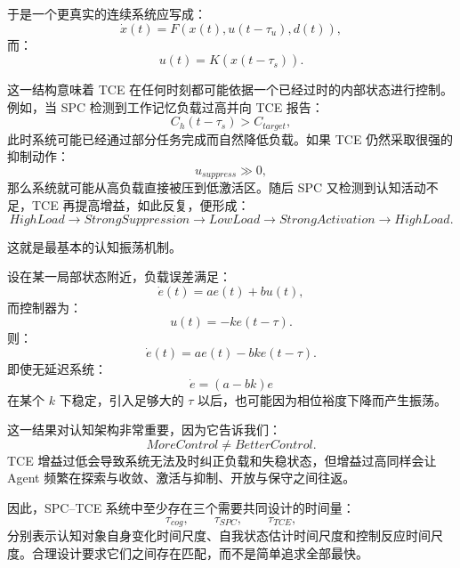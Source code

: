 于是一个更真实的连续系统应写成：
\begin{equation}
\dot{x}(t)
=
F
\left(
x(t),
u(t-\tau_u),
d(t)
\right),
\end{equation}
而：
\begin{equation}
u(t)
=
K
\left(
\hat{x}(t-\tau_s)
\right).
\end{equation}

这一结构意味着 TCE 在任何时刻都可能依据一个已经过时的内部状态进行控制。例如，当 SPC 检测到工作记忆负载过高并向 TCE 报告：
\begin{equation}
C_h(t-\tau_s)>C_{target},
\end{equation}
此时系统可能已经通过部分任务完成而自然降低负载。如果 TCE 仍然采取很强的抑制动作：
\begin{equation}
u_{suppress}\gg0,
\end{equation}
那么系统就可能从高负载直接被压到低激活区。随后 SPC 又检测到认知活动不足，TCE 再提高增益，如此反复，便形成：
\begin{equation}
HighLoad
\rightarrow
StrongSuppression
\rightarrow
LowLoad
\rightarrow
StrongActivation
\rightarrow
HighLoad.
\end{equation}

这就是最基本的认知振荡机制。

设在某一局部状态附近，负载误差满足：
\begin{equation}
\dot e(t)
=
ae(t)+bu(t),
\end{equation}
而控制器为：
\begin{equation}
u(t)
=
-k e(t-\tau).
\end{equation}
则：
\begin{equation}
\dot e(t)
=
ae(t)
-
bk e(t-\tau).
\end{equation}
即使无延迟系统：
\begin{equation}
\dot e=(a-bk)e
\end{equation}
在某个 $k$ 下稳定，引入足够大的 $\tau$ 以后，也可能因为相位裕度下降而产生振荡。

这一结果对认知架构非常重要，因为它告诉我们：
\begin{equation}
\boxed{
MoreControl
\neq
BetterControl.
}
\end{equation}
TCE 增益过低会导致系统无法及时纠正负载和失稳状态，但增益过高同样会让 Agent 频繁在探索与收敛、激活与抑制、开放与保守之间往返。

因此，SPC--TCE 系统中至少存在三个需要共同设计的时间量：
\begin{equation}
\tau_{cog},
\qquad
\tau_{SPC},
\qquad
\tau_{TCE},
\end{equation}
分别表示认知对象自身变化时间尺度、自我状态估计时间尺度和控制反应时间尺度。合理设计要求它们之间存在匹配，而不是简单追求全部最快。

